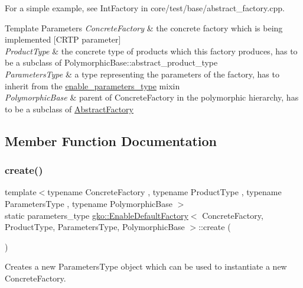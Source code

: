 For a simple example, see Int\+Factory in {\ttfamily core/test/base/abstract\+\_\+factory.\+cpp}.


\begin{DoxyTemplParams}{Template Parameters}
{\em Concrete\+Factory} & the concrete factory which is being implemented \mbox{[}C\+R\+TP parameter\mbox{]} \\
\hline
{\em Product\+Type} & the concrete type of products which this factory produces, has to be a subclass of Polymorphic\+Base\+::abstract\+\_\+product\+\_\+type \\
\hline
{\em Parameters\+Type} & a type representing the parameters of the factory, has to inherit from the \hyperlink{structgko_1_1enable__parameters__type}{enable\+\_\+parameters\+\_\+type} mixin \\
\hline
{\em Polymorphic\+Base} & parent of Concrete\+Factory in the polymorphic hierarchy, has to be a subclass of \hyperlink{classgko_1_1AbstractFactory}{Abstract\+Factory} \\
\hline
\end{DoxyTemplParams}


\subsection{Member Function Documentation}
\mbox{\label{classgko_1_1EnableDefaultFactory_a1d077101d9e788e6c65f088612d14cc3}} 
\subsubsection{\texorpdfstring{create()}{create()}}
{\footnotesize\ttfamily template$<$typename Concrete\+Factory , typename Product\+Type , typename Parameters\+Type , typename Polymorphic\+Base $>$ \\
static parameters\+\_\+type \hyperlink{classgko_1_1EnableDefaultFactory}{gko\+::\+Enable\+Default\+Factory}$<$ Concrete\+Factory, Product\+Type, Parameters\+Type, Polymorphic\+Base $>$\+::create (\begin{DoxyParamCaption}{ }\end{DoxyParamCaption})\hspace{0.3cm}{\ttfamily [static]}}



Creates a new Parameters\+Type object which can be used to instantiate a new Concrete\+Factory. 

